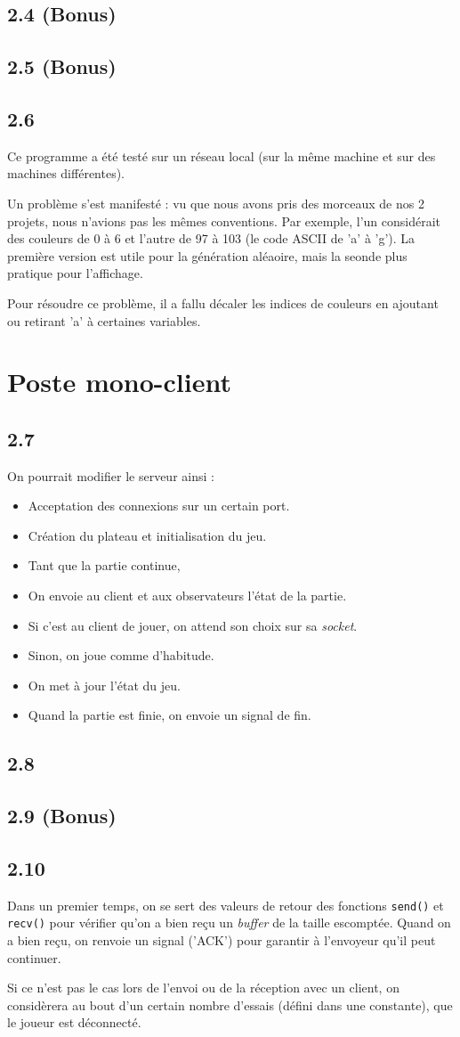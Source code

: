 \documentclass[12pt]{article}
\def\question#1{\subsection{#1}}
\def\sec#1{\section{#1}}
\begin{document}
  

\question{2.4 (Bonus)}


\question{2.5 (Bonus)}

\question{2.6} %

Ce programme a été testé sur un réseau local (sur la même machine et sur des machines différentes).

Un problème s'est manifesté : vu que nous avons pris des morceaux de nos 2 projets, nous n'avions pas les mêmes conventions. Par exemple, l'un considérait des couleurs de 0 à 6 et l'autre de 97 à 103 (le code ASCII de 'a' à 'g'). La première version est utile pour la génération aléaoire, mais la seonde plus pratique pour l'affichage.

Pour résoudre ce problème, il a fallu décaler les indices de couleurs en ajoutant ou retirant 'a' à certaines variables.


\sec{Poste mono-client}
\question{2.7}
On pourrait modifier le serveur ainsi :
\begin{itemize}
  \item Acceptation des connexions sur un certain port.
  \item Création du plateau et initialisation du jeu.
  \item Tant que la partie continue,
  \item On envoie au client et aux observateurs l'état de la partie.
  \item Si c'est au client de jouer, on attend son choix sur sa \textit{socket}.
  \item Sinon, on joue comme d'habitude.
  \item On met à jour l'état du jeu.
  \item Quand la partie est finie, on envoie un signal de fin.
\end{itemize}




\question{2.8}

\question{2.9 (Bonus)}

\question{2.10}
Dans un premier temps, on se sert des valeurs de retour des fonctions \texttt{send()} et \texttt{recv()} pour vérifier qu'on a bien reçu un \textit{buffer} de la taille escomptée.
Quand on a bien reçu, on renvoie un signal ('ACK') pour garantir à l'envoyeur qu'il peut continuer.

Si ce n'est pas le cas lors de l'envoi ou de la réception avec un client, on considèrera au bout d'un certain nombre d'essais (défini dans une constante), que le joueur est déconnecté.
\end{document}
